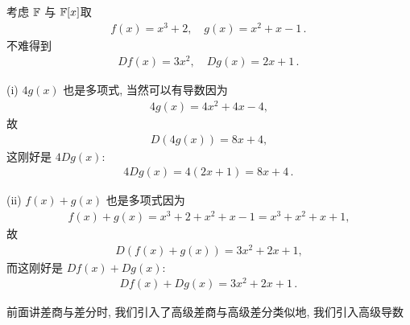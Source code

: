 \begin{example}
    考虑 $\mathbb{F}$ 与 $\mathbb{F}[x]$\period 取
    \begin{align*}
        f(x) = x^3 + 2, \quad g(x) = x^2 + x - 1 \period
    \end{align*}
    不难得到
    \begin{align*}
        Df (x) = 3x^2, \quad Dg (x) = 2x + 1 \period
    \end{align*}

    (i) $4g(x)$ 也是多项式, 当然可以有导数\period 因为
    \begin{align*}
        4g(x) = 4x^2 + 4x - 4,
    \end{align*}
    故
    \begin{align*}
        D(4g(x)) = 8x + 4,
    \end{align*}
    这刚好是 $4Dg(x)$:
    \begin{align*}
        4Dg(x) = 4(2x + 1) = 8x + 4 \period
    \end{align*}

    (ii) $f(x) + g(x)$ 也是多项式\period 因为
    \begin{align*}
        f(x) + g(x) = x^3 + 2 + x^2 + x - 1 = x^3 + x^2 + x + 1,
    \end{align*}
    故
    \begin{align*}
        D(f(x) + g(x)) = 3x^2 + 2x + 1,
    \end{align*}
    而这刚好是 $Df(x) + Dg(x)$:
    \begin{align*}
        Df(x) + Dg(x) = 3x^2 + 2x + 1 \period
    \end{align*}
\end{example}

前面讲差商与差分时, 我们引入了高级差商与高级差分\period 类似地, 我们引入高级导数\period

